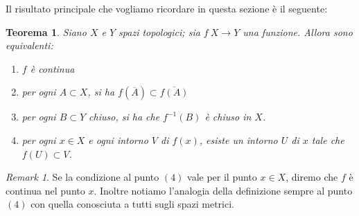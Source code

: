 \documentclass[10pt,a4paper]{article}
\theoremstyle{definition}
\theoremstyle{plain}
\newtheorem{teo}{Teorema}
\theoremstyle{remark}
\newtheorem{rem}{Remark}
\theoremstyle{remark}
\begin{document}
Il risultato principale che vogliamo ricordare in questa sezione è il seguente:
\begin{teo}\label{CondequivCont} Siano $X$ e $Y$ spazi topologici; sia $f \: X
\to Y$ una funzione. Allora sono equivalenti:
\begin{enumerate}
\item $f$ è continua
\item per ogni $A \subset X$, si ha $f(\overline{A}) \subset \overline{f(A)}$
\item per ogni $B \subset Y$ chiuso, si ha che $f^{-1}(B)$ è chiuso in $X$.
\item per ogni $x \in X$ e ogni intorno $V$ di $f(x)$, esiste un intorno $U$ di
$x$ tale che $f(U) \subset V$.
\end{enumerate}

\end{teo}

\begin{rem} Se la condizione al punto $(4)$ vale per il punto $x \in X$, diremo
che $f$ è continua nel punto $x$. Inoltre notiamo l'analogia della definizione
sempre al punto $(4)$ con quella conosciuta a tutti sugli spazi metrici.
\end{rem}
\end{document}

